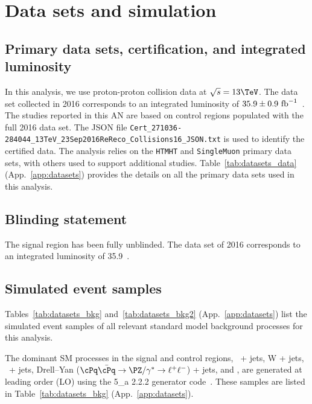 \section{Data sets and simulation}
\label{sec:datasets}

\subsection{Primary data sets, certification, and integrated luminosity}

In this analysis, we use proton-proton collision data at $\sqrt{s} =
13\TeV$. The data set collected in 2016 corresponds to an integrated
luminosity of $35.9 \pm 0.9~\text{fb}^{-1}$~\cite{lumi}. The studies reported in
this AN are based on control regions populated with the full 2016 data
set. The JSON file
\verb!Cert_271036-284044_13TeV_23Sep2016ReReco_Collisions16_JSON.txt!
is used to identify the certified data. The analysis relies on the
\verb!HTMHT! and \verb!SingleMuon! primary data sets, with others used
to support additional studies. Table~\ref{tab:datasets_data}
(App.~\ref{app:datasets}) provides the details on all the primary data
sets used in this analysis.

\subsection{Blinding statement}
\label {sec:blinding}

The signal region has been fully unblinded. The data set of 2016
corresponds to an integrated luminosity of 35.9~\ifb. 

\subsection{Simulated event samples}

Tables~\ref{tab:datasets_bkg} and~\ref{tab:datasets_bkg2}
(App.~\ref{app:datasets}) list the simulated event samples of all
relevant standard model background processes for this analysis.

The dominant SM processes in the signal and control regions, \znunu\ +
jets, W + jets, \ttbar\ + jets, Drell--Yan ($\cPq\bar{\cPq} \to
\PZ/\gamma^* \to \ell^+\ell^-$) + jets, and \gj, are generated at
leading order (LO) using the {\MADGRAPH{}5\_a\MCATNLO} 2.2.2 generator
code~\cite{madgraph}. These samples are listed in
Table~\ref{tab:datasets_bkg} (App.~\ref{app:datasets}).

